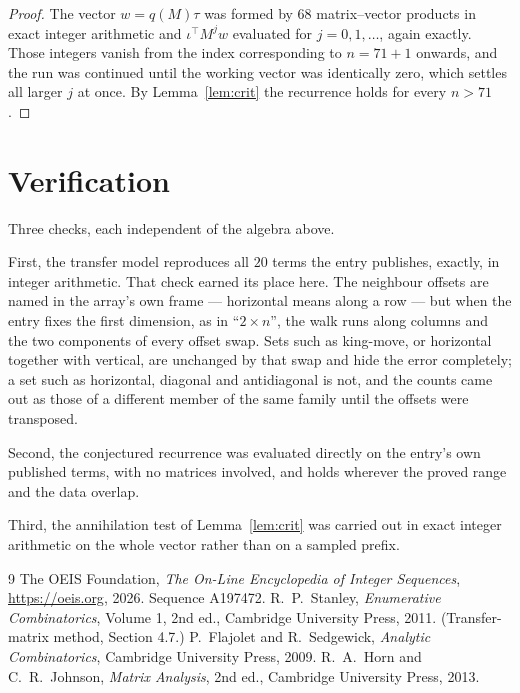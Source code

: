 \documentclass[11pt,a4paper]{article}
\theoremstyle{plain}
\theoremstyle{definition}
\begin{document}
\begin{proof}
The vector $w=q(M)\tau$ was formed by $68$ matrix--vector products in exact integer
arithmetic and $\iota^{\!\top}M^{j}w$ evaluated for $j=0,1,\dots$, again exactly. Those
integers vanish from the index corresponding to $n=71+1$ onwards, and the run was
continued until the working vector was identically zero, which settles all larger $j$ at once.
By Lemma~\ref{lem:crit} the recurrence holds for every $n>71$.
\end{proof}

\section{Verification}

Three checks, each independent of the algebra above.

First, the transfer model reproduces all $20$ terms the entry publishes, exactly, in
integer arithmetic. That check earned its place here. The neighbour offsets are named in the
array's own frame --- horizontal means along a row --- but when the entry fixes the first
dimension, as in ``$2\times n$'', the walk runs along columns and the two components of every
offset swap. Sets such as king-move, or horizontal together with vertical, are unchanged by
that swap and hide the error completely; a set such as horizontal, diagonal and antidiagonal
is not, and the counts came out as those of a different member of the same family until the
offsets were transposed.

Second, the conjectured recurrence was evaluated directly on the entry's own published terms,
with no matrices involved, and holds wherever the proved range and the data overlap.

Third, the annihilation test of Lemma~\ref{lem:crit} was carried out in exact integer
arithmetic on the whole vector rather than on a sampled prefix.

\begin{thebibliography}{9}
 The OEIS Foundation, \emph{The On-Line Encyclopedia of Integer
Sequences}, \url{https://oeis.org}, 2026. Sequence A197472.
 R.~P.~Stanley, \emph{Enumerative Combinatorics}, Volume 1, 2nd ed.,
Cambridge University Press, 2011. (Transfer-matrix method, Section 4.7.)
 P.~Flajolet and R.~Sedgewick, \emph{Analytic Combinatorics}, Cambridge
University Press, 2009.
 R.~A.~Horn and C.~R.~Johnson, \emph{Matrix Analysis}, 2nd ed., Cambridge
University Press, 2013.
\end{thebibliography}
\end{document}
